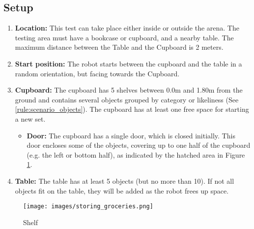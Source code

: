 %
%
\begin{minipage}{0.70\textwidth}
	\subsection{Setup}
	\begin{enumerate}
		\item \textbf{Location:} This test can take place either inside or outside the arena. The testing area must have a bookcase or cupboard, and a nearby table. The maximum distance between the Table and the Cupboard is 2 meters.
		\item \textbf{Start position:} The robot starts between the cupboard and the table in a random orientation, but facing towards the Cupboard.
		\item \textbf{Cupboard:} The cupboard has 5 shelves between 0.0m and 1.80m from the ground and contains several objects grouped by category or likeliness (See \ref{rule:scenario_objects}). The cupboard has at least one free space for starting a new set.
		\begin{itemize}
		 	\item \textbf{Door:} The cupboard has a single door, which is closed initially.
		 	This door encloses some of the objects, covering up to one half of the cupboard (e.g. the left or bottom half), as indicated by the hatched area in Figure \ref{fig:storing_groceries_shelf}.
		\end{itemize}
		\item \textbf{Table:} The table has at least 5 objects (but no more than 10). If not all objects fit on the table, they will be added as the robot frees up space.
	\end{enumerate}
\end{minipage}\hfill
\begin{minipage}{0.25\textwidth}
	\begin{figure}[H]
		\centering
		\texttt{[image: images/storing\_groceries.png]}%
		\vspace{-10pt}
		\caption{Shelf}
		\label{fig:storing_groceries_shelf}
	\end{figure}
\end{minipage}

%
%
